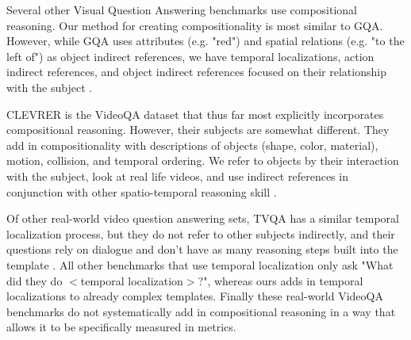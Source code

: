 Several other Visual Question Answering benchmarks use compositional reasoning. Our method for creating compositionality is most similar to GQA. However, while GQA uses attributes (e.g. "red") and spatial relations (e.g. "to the left of") as object indirect references, we have temporal localizations, action indirect references, and object indirect references focused on their relationship with the subject \cite{hudson2019gqa}. 

CLEVRER is the VideoQA dataset that thus far most explicitly incorporates compositional reasoning. However, their subjects are somewhat different. They add in compositionality with descriptions of objects (shape, color, material), motion, collision, and temporal ordering. We refer to objects by their interaction with the subject, look at real life videos, and use indirect references in conjunction with other spatio-temporal reasoning skill \cite{yi2019clevrer}.

Of other real-world video question answering sets, TVQA has a similar temporal localization process, but they do not refer to other subjects indirectly, and their questions rely on dialogue and don't have as many reasoning steps built into the template \cite{lei2018tvqa}. All other benchmarks that use temporal localization only ask "What did they do $<$temporal localization$>$?", whereas ours adds in temporal localizations to already complex templates. Finally these real-world VideoQA benchmarks do not systematically add in compositional reasoning in a way that allows it to be specifically measured in metrics. 



